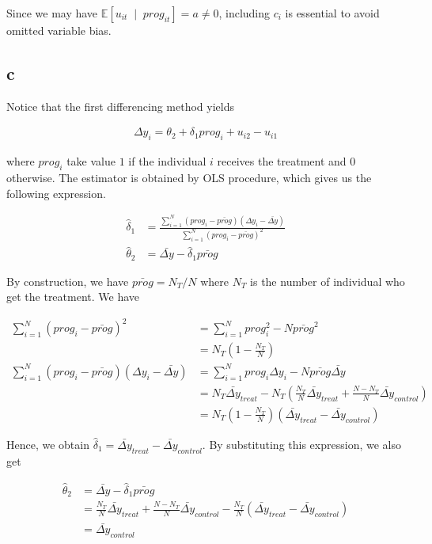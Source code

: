 \documentclass[11pt]{article}
\newcommand{\E}{\mathbb{E}}
\renewcommand{\hat}{\widehat}
\theoremstyle{definition}
\begin{document}
Since we may have $\E[u_{it} \;\mid \; prog_{it}] = a \neq 0$, including $c_i$ is essential to avoid omitted variable bias.

\subsection*{c}

Notice that the first differencing method yields

\begin{align*}
    \Delta y_i = \theta_2 + \delta_1 prog_{i} + u_{i2} - u_{i1}
\end{align*}

where $prog_{i}$ take value $1$ if the individual $i$ receives the treatment and $0$ otherwise. The estimator is obtained by OLS procedure, which gives us the following expression.

\begin{align*}
    \hat{\delta}_1 &= \frac{\sum_{i=1}^{N} (prog_i - \bar{prog}) (\Delta y_i - \bar{\Delta y})}{\sum_{i=1}^{N} (prog_i - \bar{prog})^2} \\
    \hat{\theta}_2 &= \bar{\Delta y} - \hat{\delta}_1 \bar{prog}
\end{align*}

By construction, we have $\bar{prog} = N_T/N$ where $N_T$ is the number of individual who get the treatment. We have

\begin{align*}
    \sum_{i=1}^{N} (prog_i - \bar{prog})^2
    &= \sum_{i=1}^{N} prog_i^2 - N \bar{prog}^2 \\
    &= N_T (1 - \frac{N_T}{N}) \\
    \sum_{i=1}^{N} (prog_i - \bar{prog}) (\Delta y_i - \bar{\Delta y})
    &= \sum_{i=1}^{N} prog_i \Delta y_i - N \bar{prog} \bar{\Delta y} \\
    &= N_T \bar{\Delta y}_{treat} - N_T \left( \frac{N_T}{N} \bar{\Delta y}_{treat} + \frac{N - N_T}{N} \bar{\Delta y}_{control} \right) \\
    &= N_T \left( 1 - \frac{N_T}{N} \right) (\bar{\Delta y}_{treat} - \bar{\Delta y}_{control})
\end{align*}

Hence, we obtain $\hat{\delta}_1 = \bar{\Delta y}_{treat} - \bar{\Delta y}_{control}$. By substituting this expression, we also get

\begin{align*}
    \hat{\theta}_2
    &= \bar{\Delta y} - \hat{\delta}_1 \bar{prog} \\
    &= \frac{N_T}{N} \bar{\Delta y}_{treat} + \frac{N - N_T}{N} \bar{\Delta y}_{control} - \frac{N_T}{N} (\bar{\Delta y}_{treat} - \bar{\Delta y}_{control}) \\
    &= \bar{\Delta y}_{control}
\end{align*}
\end{document}
